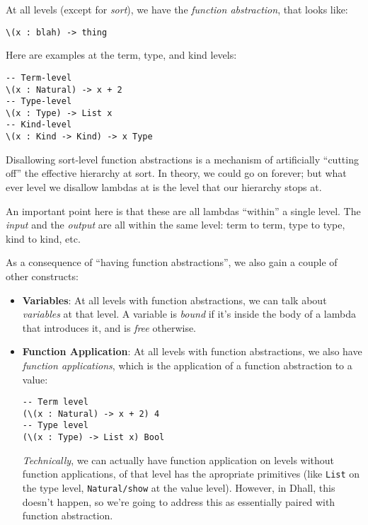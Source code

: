 \documentclass[]{article}
\begin{document}
At all levels (except for \emph{sort}), we have the \emph{function abstraction},
that looks like:

\begin{verbatim}
\(x : blah) -> thing
\end{verbatim}

Here are examples at the term, type, and kind levels:

\begin{verbatim}
-- Term-level
\(x : Natural) -> x + 2
-- Type-level
\(x : Type) -> List x
-- Kind-level
\(x : Kind -> Kind) -> x Type
\end{verbatim}

Disallowing sort-level function abstractions is a mechanism of artificially
``cutting off'' the effective hierarchy at sort. In theory, we could go on
forever; but what ever level we disallow lambdas at is the level that our
hierarchy stops at.

An important point here is that these are all lambdas ``within'' a single level.
The \emph{input} and the \emph{output} are all within the same level: term to
term, type to type, kind to kind, etc.

As a consequence of ``having function abstractions'', we also gain a couple of
other constructs:

\begin{itemize}
\item
  \textbf{Variables}: At all levels with function abstractions, we can talk
  about \emph{variables} at that level. A variable is \emph{bound} if it's
  inside the body of a lambda that introduces it, and is \emph{free} otherwise.
\item
  \textbf{Function Application}: At all levels with function abstractions, we
  also have \emph{function applications}, which is the application of a function
  abstraction to a value:

\begin{verbatim}
-- Term level
(\(x : Natural) -> x + 2) 4
-- Type level
(\(x : Type) -> List x) Bool
\end{verbatim}

  \emph{Technically}, we can actually have function application on levels
  without function applications, of that level has the apropriate primitives
  (like \texttt{List} on the type level, \texttt{Natural/show} at the value
  level). However, in Dhall, this doesn't happen, so we're going to address this
  as essentially paired with function abstraction.
\end{itemize}
\end{document}
